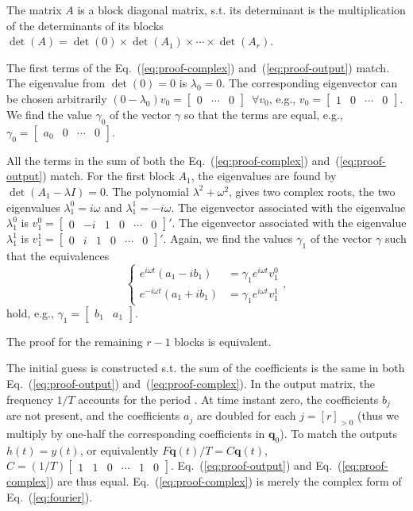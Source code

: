 \documentclass[letterpaper,10pt,journal,twoside]{IEEEtran}
\theoremstyle{definition}
\begin{document}
{The matrix $A$ is a block diagonal matrix, s.t. its determinant is the multiplication of the determinants of its blocks $\det{(A)}=\det{(0)}\times\det{(A_1)}\times\cdots\times\det{(A_r)}$.

The first terms of the Eq.~(\ref{eq:proof-complex}) and~(\ref{eq:proof-output}) match. The eigenvalue from $\det(0)=0$ is $\lambda_0=0$. The corresponding eigenvector can be chosen arbitrarily $(0-\lambda_0)v_0=\begin{bmatrix} 0 & \cdots & 0 \end{bmatrix}\,\,\,\forall v_0$, e.g., $v_0=\begin{bmatrix}1 & 0 & \cdots & 0\end{bmatrix}$. We find the value $\gamma_0$ of the vector $\gamma$ so that the terms are equal, e.g., $\gamma_0=\begin{bmatrix}a_0 & 0 & \cdots & 0\end{bmatrix}$. 

All the terms in the sum of both the Eq.~(\ref{eq:proof-complex}) and~(\ref{eq:proof-output}) match. For the first block $A_1$, the eigenvalues are found by $\det(A_1-\lambda I)=0$. The polynomial $\lambda^2+\omega^2$, gives two complex roots, the two eigenvalues $\lambda_1^0=i\omega$ and $\lambda_1^1=-i\omega$. The eigenvector associated with the eigenvalue $\lambda_1^0$ is $v_1^0=\begin{bmatrix}0 & -i&1&0&\cdots&0\end{bmatrix}'$. The eigenvector associated with the eigenvalue $\lambda_1^1$ is $v_1^1=\begin{bmatrix}0&i&1&0&\cdots&0\end{bmatrix}'$. Again, we find the values $\gamma_1$ of the vector $\gamma$ such that the equivalences 
\begin{equation}\begin{cases}
  e^{i\omega t}(a_1-ib_1)&=\gamma_1 e^{i\omega t}v_1^0\\
  e^{-i\omega t}(a_1+ib_1)&=\gamma_1 e^{i\omega t}v_1^1
\end{cases},\end{equation}
hold, e.g., $\gamma_1=\begin{bmatrix}b_1&a_1\end{bmatrix}$. 

The proof for the remaining $r-1$ blocks is equivalent.

The initial guess is constructed s.t. the sum of the coefficients is the same in both Eq.~(\ref{eq:proof-output}) and~(\ref{eq:proof-complex}). In the output matrix, the frequency $1/T$ accounts for the period%
. At time instant zero, the coefficients $b_j$ are not present, and the coefficients $a_j$ are doubled for each $j=[r]_{>0}$ (thus we multiply by one-half the corresponding coefficients in $\mathbf{q}_0$). To match the outputs $h(t)=y(t)$, or equivalently $F\mathbf{q}(t)/T=C\mathbf{q}(t)$, $C=(1/T)\begin{bmatrix}1 & 1 & 0 & \cdots & 1 & 0\end{bmatrix}$. Eq.~(\ref{eq:proof-output}) and Eq.~(\ref{eq:proof-complex}) are thus equal. Eq.~(\ref{eq:proof-complex}) is merely the complex form of Eq.~(\ref{eq:fourier}).

}
\end{document}
